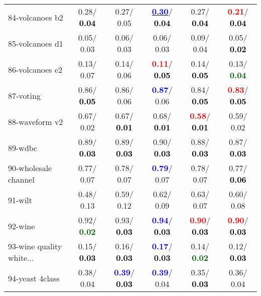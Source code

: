 \begin{table}[h]
\begin{center}
\begin{tabular}{lc|c|c|c|c}
84-volcanoes b2 &   0.28/\textcolor{black}{\textbf{  0.04}} &   0.27/  0.05 & \underline{\textcolor{blue}{\textbf{  0.30}}}/\textcolor{black}{\textbf{  0.04}} &   0.27/\textcolor{black}{\textbf{  0.04}} & \textcolor{red}{\textbf{  0.21}}/\textcolor{black}{\textbf{  0.04}} \\
85-volcanoes d1 &   0.05/  0.03 &   0.06/  0.03 &   0.06/  0.03 &   0.09/  0.04 &   0.05/\textcolor{black}{\textbf{  0.02}} \\ \hline
86-volcanoes e2 &   0.13/  0.07 &   0.14/  0.06 & \textcolor{red}{\textbf{  0.11}}/\textcolor{black}{\textbf{  0.05}} &   0.14/\textcolor{black}{\textbf{  0.05}} &   0.13/\textcolor{darkgreen}{\textbf{  0.04}} \\
87-voting &   0.86/\textcolor{black}{\textbf{  0.05}} &   0.86/  0.06 & \textcolor{blue}{\textbf{  0.87}}/  0.06 &   0.84/\textcolor{black}{\textbf{  0.05}} & \textcolor{red}{\textbf{  0.83}}/\textcolor{black}{\textbf{  0.05}} \\
88-waveform v2 &   0.67/  0.02 &   0.67/\textcolor{black}{\textbf{  0.01}} &   0.68/\textcolor{black}{\textbf{  0.01}} & \textcolor{red}{\textbf{  0.58}}/\textcolor{black}{\textbf{  0.01}} &   0.59/  0.02 \\
89-wdbc &   0.89/\textcolor{black}{\textbf{  0.03}} &   0.89/\textcolor{black}{\textbf{  0.03}} &   0.90/\textcolor{black}{\textbf{  0.03}} &   0.88/\textcolor{black}{\textbf{  0.03}} &   0.87/\textcolor{black}{\textbf{  0.03}} \\
90-wholesale channel &   0.77/  0.07 &   0.78/  0.07 & \textcolor{blue}{\textbf{  0.79}}/  0.07 &   0.78/  0.07 &   0.77/\textcolor{black}{\textbf{  0.06}} \\
91-wilt &   0.48/  0.13 &   0.59/  0.12 &   0.62/  0.09 &   0.63/  0.07 &   0.60/  0.08 \\
92-wine &   0.92/\textcolor{darkgreen}{\textbf{  0.02}} &   0.93/\textcolor{black}{\textbf{  0.03}} & \textcolor{blue}{\textbf{  0.94}}/\textcolor{black}{\textbf{  0.03}} & \textcolor{red}{\textbf{  0.90}}/\textcolor{black}{\textbf{  0.03}} & \textcolor{red}{\textbf{  0.90}}/\textcolor{black}{\textbf{  0.03}} \\ \hline
93-wine quality white... &   0.15/\textcolor{black}{\textbf{  0.03}} &   0.16/\textcolor{black}{\textbf{  0.03}} & \textcolor{blue}{\textbf{  0.17}}/\textcolor{black}{\textbf{  0.03}} &   0.14/\textcolor{darkgreen}{\textbf{  0.02}} &   0.12/\textcolor{black}{\textbf{  0.03}} \\
94-yeast 4class &   0.38/  0.04 & \textcolor{blue}{\textbf{  0.39}}/\textcolor{black}{\textbf{  0.03}} & \textcolor{blue}{\textbf{  0.39}}/  0.04 &   0.35/\textcolor{black}{\textbf{  0.03}} &   0.36/  0.04 \\\end{tabular}\label{stratsALCKappa2bRFwRedux}
\end{center}
\end{table}
